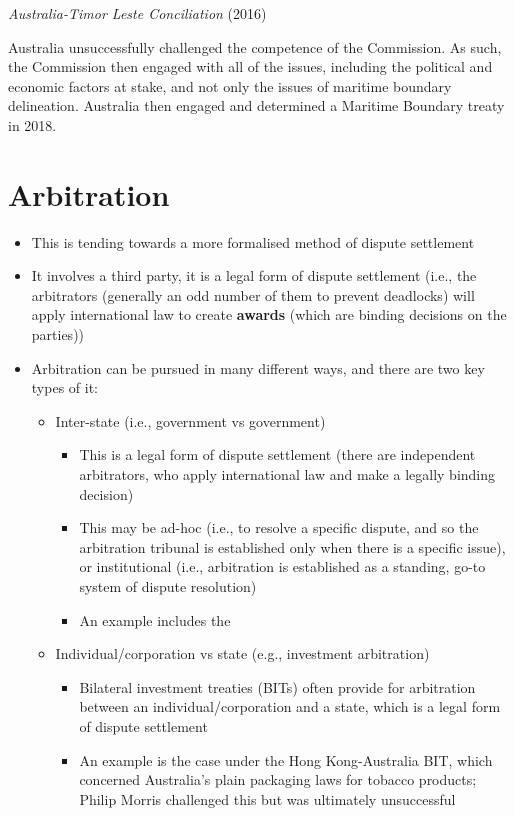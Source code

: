 \begin{casedetails}{\textit{Australia-Timor Leste Conciliation} (2016)}
    \vspace{\baselineskip}

    Australia unsuccessfully challenged the competence of the Commission. As such, the Commission then engaged with all of the issues, including the political and economic factors at stake, and not only the issues of maritime boundary delineation. Australia then engaged and determined a Maritime Boundary treaty in 2018.
\end{casedetails}

\section{Arbitration}
\begin{itemize}
    \item This is tending towards a more formalised method of dispute settlement
    \item It involves a third party, it is a legal form of dispute settlement (i.e., the arbitrators (generally an odd number of them to prevent deadlocks) will apply international law to create \textbf{awards} (which are binding decisions on the parties))
    \item Arbitration can be pursued in many different ways, and there are two key types of it:
    \begin{itemize}
        \item Inter-state (i.e., government vs government)
        \begin{itemize}
            \item This is a legal form of dispute settlement (there are independent arbitrators, who apply international law and make a legally binding decision)
            \item This may be ad-hoc (i.e., to resolve a specific dispute, and so the arbitration tribunal is established only when there is a specific issue), or institutional (i.e., arbitration is established as a standing, go-to system of dispute resolution)
            \item An example includes the 
        \end{itemize}
        \item Individual/corporation vs state (e.g., investment arbitration)
        \begin{itemize}
            \item Bilateral investment treaties (BITs) often provide for arbitration between an individual/corporation and a state, which is a legal form of dispute settlement
            \item An example is the  case under the Hong Kong-Australia BIT, which concerned Australia's plain packaging laws for tobacco products; Philip Morris challenged this but was ultimately unsuccessful
        \end{itemize}
    \end{itemize}
\end{itemize}

